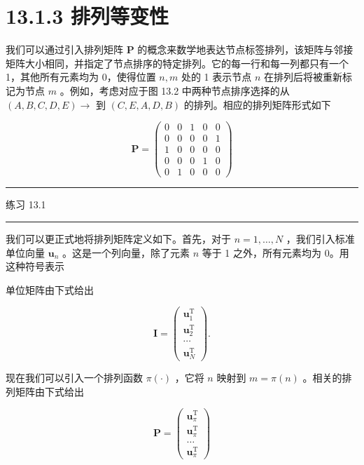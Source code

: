 \documentclass[10pt]{article}
\newcommand{\HRule}{\begin{center}\rule{0.9\linewidth}{0.2mm}\end{center}}
\begin{document}
\section*{13.1.3 排列等变性}

我们可以通过引入排列矩阵 \(\mathbf{P}\) 的概念来数学地表达节点标签排列，该矩阵与邻接矩阵大小相同，并指定了节点排序的特定排列。它的每一行和每一列都只有一个 1，其他所有元素均为 0，使得位置 \(n,m\) 处的 1 表示节点 \(n\) 在排列后将被重新标记为节点 \(m\) 。例如，考虑对应于图 13.2 中两种节点排序选择的从 \(\left( {A,B,C,D,E}\right)  \rightarrow\) 到 \(\left( {C,E,A,D,B}\right)\) 的排列。相应的排列矩阵形式如下

\[
\mathbf{P} = \left( \begin{array}{lllll} 0 & 0 & 1 & 0 & 0 \\  0 & 0 & 0 & 0 & 1 \\  1 & 0 & 0 & 0 & 0 \\  0 & 0 & 0 & 1 & 0 \\  0 & 1 & 0 & 0 & 0 \end{array}\right)  \tag{13.1}
\]

\HRule

练习 13.1

\HRule

我们可以更正式地将排列矩阵定义如下。首先，对于 \(n = 1,\ldots ,N\) ，我们引入标准单位向量 \({\mathbf{u}}_{n}\) 。这是一个列向量，除了元素 \(n\) 等于 1 之外，所有元素均为 0。用这种符号表示

单位矩阵由下式给出

\[
\mathbf{I} = \left( \begin{matrix} {\mathbf{u}}_{1}^{\mathrm{T}} \\  {\mathbf{u}}_{2}^{\mathrm{T}} \\  \cdots \\  {\mathbf{u}}_{N}^{\mathrm{T}} \end{matrix}\right) . \tag{13.2}
\]

现在我们可以引入一个排列函数 \(\pi \left( \cdot \right)\) ，它将 \(n\) 映射到 \(m = \pi \left( n\right)\) 。相关的排列矩阵由下式给出

\[
\mathbf{P} = \left( \begin{matrix} {\mathbf{u}}_{\pi }^{\mathrm{T}} \\  {\mathbf{u}}_{\pi }^{\mathrm{T}} \\  \ldots \\  {\mathbf{u}}_{\pi }^{\mathrm{T}} \end{matrix}\right)  \tag{13.3}
\]
\end{document}
